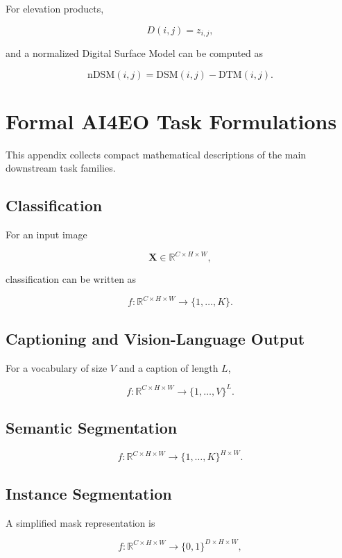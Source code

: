 \documentclass[11pt,a4paper]{article}
\begin{document}
For elevation products,

\[
D(i,j)=z_{i,j},
\]

and a normalized Digital Surface Model can be computed as

\[
\mathrm{nDSM}(i,j)=\mathrm{DSM}(i,j)-\mathrm{DTM}(i,j).
\]

\section{Formal AI4EO Task Formulations}
\label{app:task-formulations}

This appendix collects compact mathematical descriptions of the main
downstream task families.

\subsection{Classification}

For an input image

\[
\mathbf{X}\in\mathbb{R}^{C\times H\times W},
\]

classification can be written as

\[
f:
\mathbb{R}^{C\times H\times W}
\rightarrow
\{1,\ldots,K\}.
\]

\subsection{Captioning and Vision-Language Output}

For a vocabulary of size \(V\) and a caption of length \(L\),

\[
f:
\mathbb{R}^{C\times H\times W}
\rightarrow
\{1,\ldots,V\}^{L}.
\]

\subsection{Semantic Segmentation}

\[
f:
\mathbb{R}^{C\times H\times W}
\rightarrow
\{1,\ldots,K\}^{H\times W}.
\]

\subsection{Instance Segmentation}

A simplified mask representation is

\[
f:
\mathbb{R}^{C\times H\times W}
\rightarrow
\{0,1\}^{D\times H\times W},
\]
\end{document}
